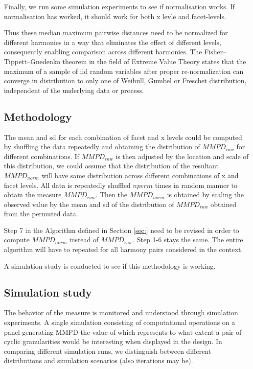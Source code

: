 \documentclass[
]{article}
\begin{document}
Finally, we run some simulation experiments to see if normalisation works. If normalisation has worked, it should work for both x levle and facet-levels.

Thus these median maximum pairwise distances need to be normalized for different harmonies in a way that eliminates the effect of different levels, consequently enabling comparison across different harmonies. The Fisher--Tippett--Gnedenko theorem in the field of Extreme Value Theory states that the maximum of a sample of iid random variables after proper re-normalization can converge in distribution to only one of Weibull, Gumbel or Freschet distribution, independent of the underlying data or process.

\hypertarget{methodology-1}{%
\subsection{Methodology}\label{methodology-1}}

The mean and sd for each combination of facet and x levels could be computed by shuffling the data repeatedly and obtaining the distribution of \(MMPD_{raw}\) for different combinations. If \(MMPD_{raw}\) is then adjusted by the location and scale of this distribution, we could assume that the distribution of the resultant \(MMPD_{norm}\) will have same distribution across different combinations of x and facet levels. All data is repeatedly shuffled \(nperm\) times in random manner to obtain the measure \(MMPD_{raw}\). Then the \(MMPD_{norm}\) is obtained by scaling the observed value by the mean and sd of the distribution of \(MMPD_{raw}\) obtained from the permuted data.

\noindent Step 7 in the Algorithm defined in Section \ref{sec:} need to be revised in order to compute \(MMPD_{norm}\) instead of \(MMPD_{raw}\). Step 1-6 stays the same. The entire algorithm will have to repeated for all harmony pairs considered in the context.

A simulation study is conducted to see if this methodology is working.

\hypertarget{simulation-study-1}{%
\subsection{Simulation study}\label{simulation-study-1}}

The behavior of the measure is monitored and understood through simulation experiments. A single simulation consisting of computational operations on a panel generating MMPD the value of which represents to what extent a pair of cyclic granularities would be interesting when displayed in the design. In comparing different simulation runs, we distinguish between different distributions and simulation scenarios (also iterations may be).
\end{document}

